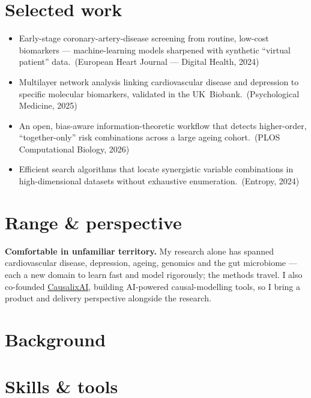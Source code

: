 \documentclass[10pt]{article}
\newcommand{\work}[2]{\item #1\ {\small\color{cvmuted}(#2)}}
\begin{document}
\section{Selected work}
\begin{itemize}
  \work{Early-stage coronary-artery-disease screening from routine, low-cost biomarkers --- machine-learning models sharpened with synthetic ``virtual patient'' data.}{European Heart Journal --- Digital Health, 2024}
  \work{Multilayer network analysis linking cardiovascular disease and depression to specific molecular biomarkers, validated in the UK~Biobank.}{Psychological Medicine, 2025}
  \work{An open, bias-aware information-theoretic workflow that detects higher-order, ``together-only'' risk combinations across a large ageing cohort.}{PLOS Computational Biology, 2026}
  \work{Efficient search algorithms that locate synergistic variable combinations in high-dimensional datasets without exhaustive enumeration.}{Entropy, 2024}
\end{itemize}

\section{Range \& perspective}
{\RaggedRight
\textbf{Comfortable in unfamiliar territory.} My research alone has spanned cardiovascular disease, depression, ageing, genomics and the gut microbiome --- each a new domain to learn fast and model rigorously; the methods travel. I also co-founded \href{https://causalix.ai}{CausalixAI}, building AI-powered causal-modelling tools, so I bring a product and delivery perspective alongside the research.\par}

\section{Background}

\section{Skills \& tools}
\end{document}

